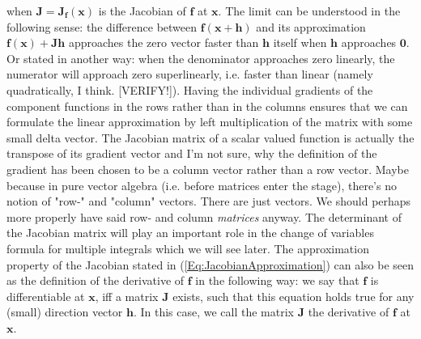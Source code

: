 when $\mathbf{J} = \mathbf{J_f}(\mathbf{x})$ is the Jacobian of  $\mathbf{f}$ at $\mathbf{x}$. The limit can be understood in the following sense: the difference between $\mathbf{f(x+h)}$ and its approximation $\mathbf{f(x) + J h}$ approaches the zero vector faster than $\mathbf{h}$ itself when $\mathbf{h}$ approaches $\mathbf{0}$. Or stated in another way: when the denominator approaches zero linearly, the numerator will approach zero superlinearly, i.e. faster than linear (namely quadratically, I think. [VERIFY!]). Having the individual gradients of the component functions in the rows rather than in the columns ensures that we can formulate the linear approximation by left multiplication of the matrix with some small delta vector. The Jacobian matrix of a scalar valued function is actually the transpose of its gradient vector and I'm not sure, why the definition of the gradient has been chosen to be a column vector rather than a row vector. Maybe because in pure vector algebra (i.e. before matrices enter the stage), there's no notion of "row-" and "column" vectors. There are just vectors. We should perhaps more properly have said row- and column \emph{matrices} anyway. The determinant of the Jacobian matrix will play an important role in the change of variables formula for multiple integrals which we will see later. The approximation property of the Jacobian stated in (\ref{Eq:JacobianApproximation}) can also be seen as the definition of the derivative of $\mathbf{f}$ in the following way: we say that $\mathbf{f}$ is differentiable at $\mathbf{x}$, iff a matrix $\mathbf{J}$ exists, such that this equation holds true for any (small) direction vector $\mathbf{h}$. In this case, we call the matrix $\mathbf{J}$ the derivative of $\mathbf{f}$ at $\mathbf{x}$.







